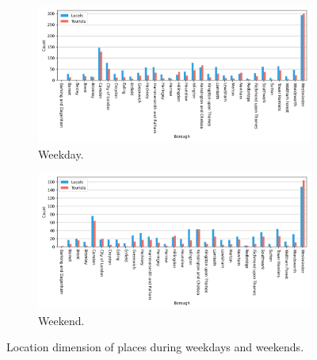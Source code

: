 \documentclass{article}
\theoremstyle{definition}
\theoremstyle{remark}
\begin{document}
\begin{figure}[!h]

\centering
\begin{subfigure}{0.6\textheight}
\centering
\includegraphics[width=0.9\linewidth]{figures/places_location_weekday.png}
\caption{Weekday.}
\label{fig:places_location_weekday}
\end{subfigure}
\begin{subfigure}{0.6\textheight}
\centering
\includegraphics[width=0.9\linewidth]{figures/places_location_weekend.png}
\caption{Weekend.}
\label{fig:places_location_weekend}
\end{subfigure}

\caption{Location dimension of places during weekdays and weekends.}
\label{fig:places_location_week}
\end{figure}
\end{document}
